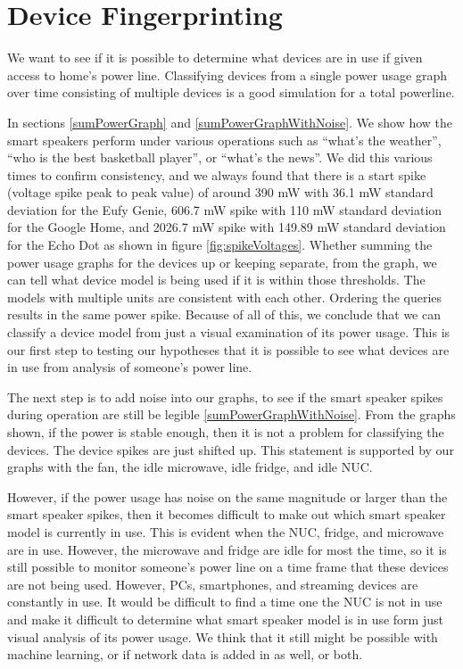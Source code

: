 \section{Device Fingerprinting}
We want to see if it is possible to determine what devices are in use if given access to home's power line. Classifying devices from a single power usage graph over time consisting of multiple devices is a good simulation for a total powerline.

In sections \ref{sumPowerGraph} and \ref{sumPowerGraphWithNoise}. We show how the smart speakers perform under various operations such as ``what's the weather'', ``who is the best basketball player'', or ``what's the news''. We did this various times to confirm consistency, and we always found that there is a start spike (voltage spike peak to peak value) of around 390 mW with 36.1 mW standard deviation for the Eufy Genie, 606.7 mW spike with 110 mW standard deviation for the Google Home, and 2026.7 mW spike with 149.89 mW standard deviation for the Echo Dot as shown in figure \ref{fig:spikeVoltages}. Whether summing the power usage graphs for the devices up or keeping separate, from the graph, we can tell what device model is being used if it is within those thresholds. The models with multiple units are consistent with each other. Ordering the queries results in the same power spike. Because of all of this, we conclude that we can classify a device model from just a visual examination of its power usage. This is our first step to testing our hypotheses that it is possible to see what devices are in use from analysis of someone's power line.

The next step is to add noise into our graphs, to see if the smart speaker spikes during operation are still be legible \ref{sumPowerGraphWithNoise}. From the graphs shown, if the power is stable enough, then it is not a problem for classifying the devices. The device spikes are just shifted up. This statement is supported by our graphs with the fan, the idle microwave, idle fridge, and idle NUC.

However, if the power usage has noise on the same magnitude or larger than the smart speaker spikes, then it becomes difficult to make out which smart speaker model is currently in use. This is evident when the NUC, fridge, and microwave are in use. However, the microwave and fridge are idle for most the time, so it is still possible to monitor someone's power line on a time frame that these devices are not being used. However, PCs, smartphones, and streaming devices are constantly in use. It would be difficult to find a time one the NUC is not in use and make it difficult to determine what smart speaker model is in use form just visual analysis of its power usage. We think that it still might be possible with machine learning, or if network data is added in as well, or both.

